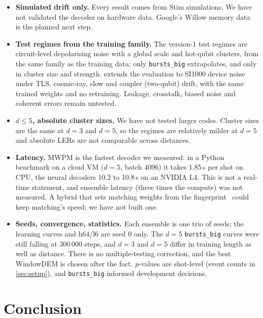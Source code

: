 \documentclass[11pt,a4paper]{article}
\newcommand{\reg}[1]{\texttt{#1}}
\begin{document}
\begin{itemize}
  \item \textbf{Simulated drift only.} Every result comes from Stim simulations. We have not validated the decoder on
        hardware data. Google's Willow memory data~\cite{google2025below} is the planned next step.
  \item \textbf{Test regimes from the training family.} The version-1 test regimes are circuit-level
        depolarising noise with a global scale and hot-qubit clusters, from the same family as the training
        data; only \reg{bursts\_big} extrapolates, and only in cluster size and strength. 
        extends the evaluation to SI1000 device noise under TLS, cosmic-ray, slow and coupler (two-qubit)
        drift, with the same trained weights and no retraining. Leakage, crosstalk, biased noise and
        coherent errors remain untested.
  \item \textbf{$d\le5$, absolute cluster sizes.} We have not tested larger codes. Cluster sizes are the same at $d=3$
        and $d=5$, so the regimes are relatively milder at $d=5$ and absolute LERs are not comparable across distances.
  \item \textbf{Latency.} MWPM is the fastest decoder we measured: in a Python benchmark on a cloud VM ($d=5$, batch 4096)
        it takes 1.85\,\textmu s per shot on CPU, the neural decoders 10.2 to 10.8\,\textmu s on an NVIDIA L4. This is not
        a real-time statement, and ensemble latency (three times the compute) was not measured. A hybrid that sets
        matching weights from the fingerprint~\cite{peled2026nmwpm,chamberland2026predecoder} could keep matching's
        speed; we have not built one.
  \item \textbf{Seeds, convergence, statistics.} Each ensemble is one trio of seeds; the learning curves and h64/l6 are
        seed 0 only. The $d=5$ \reg{bursts\_big} curves were still falling at 300\,000 steps, and $d=3$ and $d=5$ differ in
        training length as well as distance. There is no multiple-testing correction, and the best WindowDEM is chosen
        after the fact. $p$-values are shot-level (event counts in \cref{sec:setup}), and
        \reg{bursts\_big} informed development decisions.
\end{itemize}

\section{Conclusion}\label{sec:conclusion}
\end{document}
